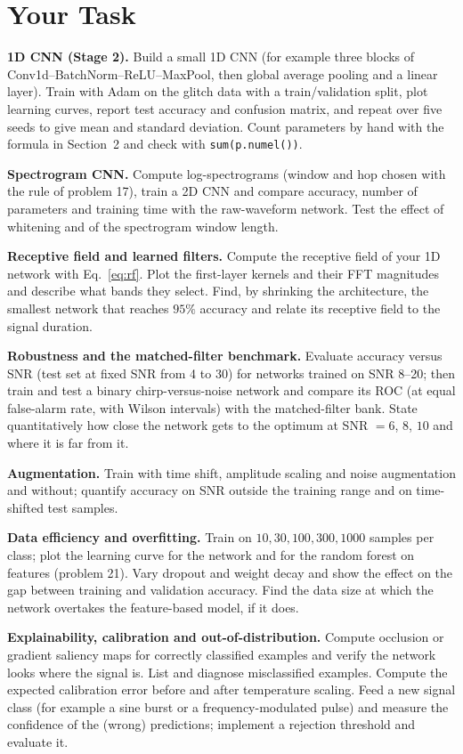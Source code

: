 \documentclass[11pt,a4paper]{article}
\begin{document}
\section*{Your Task}
\begin{tasks}
  \item \textbf{1D CNN (Stage 2).} Build a small 1D CNN (for example three blocks of Conv1d--BatchNorm--ReLU--MaxPool, then global average pooling and a linear layer). Train with Adam on the glitch data with a train/validation split, plot learning curves, report test accuracy and confusion matrix, and repeat over five seeds to give mean and standard deviation. Count parameters by hand with the formula in Section~2 and check with \texttt{sum(p.numel())}.
  \item \textbf{Spectrogram CNN.} Compute log-spectrograms (window and hop chosen with the rule of problem 17), train a 2D CNN and compare accuracy, number of parameters and training time with the raw-waveform network. Test the effect of whitening and of the spectrogram window length.
  \item \textbf{Receptive field and learned filters.} Compute the receptive field of your 1D network with Eq.~\eqref{eq:rf}. Plot the first-layer kernels and their FFT magnitudes and describe what bands they select. Find, by shrinking the architecture, the smallest network that reaches $95\%$ accuracy and relate its receptive field to the signal duration.
  \item \textbf{Robustness and the matched-filter benchmark.} Evaluate accuracy versus SNR (test set at fixed SNR from 4 to 30) for networks trained on SNR 8--20; then train and test a binary chirp-versus-noise network and compare its ROC (at equal false-alarm rate, with Wilson intervals) with the matched-filter bank. State quantitatively how close the network gets to the optimum at SNR $=6$, $8$, $10$ and where it is far from it.
  \item \textbf{Augmentation.} Train with time shift, amplitude scaling and noise augmentation and without; quantify accuracy on SNR outside the training range and on time-shifted test samples.
  \item \textbf{Data efficiency and overfitting.} Train on $10,30,100,300,1000$ samples per class; plot the learning curve for the network and for the random forest on features (problem 21). Vary dropout and weight decay and show the effect on the gap between training and validation accuracy. Find the data size at which the network overtakes the feature-based model, if it does.
  \item \textbf{Explainability, calibration and out-of-distribution.} Compute occlusion or gradient saliency maps for correctly classified examples and verify the network looks where the signal is. List and diagnose misclassified examples. Compute the expected calibration error before and after temperature scaling. Feed a new signal class (for example a sine burst or a frequency-modulated pulse) and measure the confidence of the (wrong) predictions; implement a rejection threshold and evaluate it.

\end{tasks}
\end{document}
